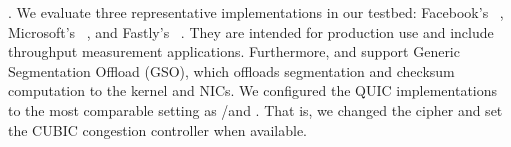\textbf{\quic}.
We evaluate three representative \quic implementations in our testbed: 
Facebook's \mvfst~\cite{mvfst-github,Joras_mvfst}, Microsoft's
\msquic~\cite{msquic-github}, and Fastly's \quicly~\cite{quicly-github}. They
are intended for production use and
include throughput measurement applications.
Furthermore, \mvfst and \quicly support Generic Segmentation Offload (GSO), 
which
offloads \udp segmentation and checksum computation to the kernel and NICs. 
We configured the QUIC implementations to the most comparable setting as 
\tls/\tcp and \tcpls. That is, we changed the cipher and set the CUBIC 
congestion controller when available.


